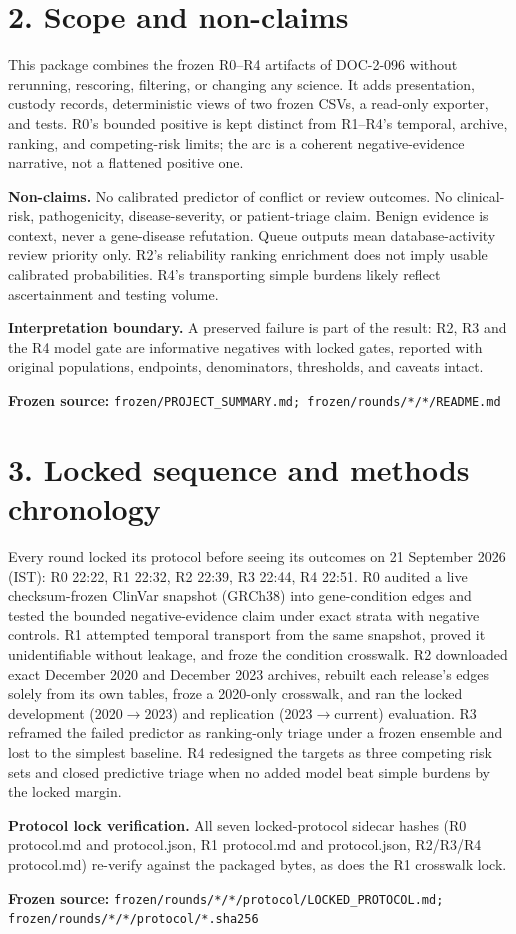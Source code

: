 \documentclass[10pt]{article}
\newcommand{\src}[1]{\par\vfill\noindent\parbox{\linewidth}{\raggedright\sloppy\scriptsize\color{BorderBlue}\textbf{Frozen source:} \texttt{#1}}}
\newcommand{\pg}[2]{\section*{#1}#2}
\begin{document}
\pg{2. Scope and non-claims}{This package combines the frozen R0--R4 artifacts of DOC-2-096 without rerunning, rescoring, filtering, or changing any science. It adds presentation, custody records, deterministic views of two frozen CSVs, a read-only exporter, and tests. R0's bounded positive is kept distinct from R1--R4's temporal, archive, ranking, and competing-risk limits; the arc is a coherent negative-evidence narrative, not a flattened positive one.\par\textbf{Non-claims.} No calibrated predictor of conflict or review outcomes. No clinical-risk, pathogenicity, disease-severity, or patient-triage claim. Benign evidence is context, never a gene-disease refutation. Queue outputs mean database-activity review priority only. R2's reliability ranking enrichment does not imply usable calibrated probabilities. R4's transporting simple burdens likely reflect ascertainment and testing volume.\par\textbf{Interpretation boundary.} A preserved failure is part of the result: R2, R3 and the R4 model gate are informative negatives with locked gates, reported with original populations, endpoints, denominators, thresholds, and caveats intact.}\src{frozen/PROJECT\_SUMMARY.md; frozen/rounds/*/*/README.md}\newpage

\pg{3. Locked sequence and methods chronology}{Every round locked its protocol before seeing its outcomes on 21 September 2026 (IST): R0 22:22, R1 22:32, R2 22:39, R3 22:44, R4 22:51. R0 audited a live checksum-frozen ClinVar snapshot (GRCh38) into gene-condition edges and tested the bounded negative-evidence claim under exact strata with negative controls. R1 attempted temporal transport from the same snapshot, proved it unidentifiable without leakage, and froze the condition crosswalk. R2 downloaded exact December 2020 and December 2023 archives, rebuilt each release's edges solely from its own tables, froze a 2020-only crosswalk, and ran the locked development (2020$\to$2023) and replication (2023$\to$current) evaluation. R3 reframed the failed predictor as ranking-only triage under a frozen ensemble and lost to the simplest baseline. R4 redesigned the targets as three competing risk sets and closed predictive triage when no added model beat simple burdens by the locked margin.\par\textbf{Protocol lock verification.} All seven locked-protocol sidecar hashes (R0 protocol.md and protocol.json, R1 protocol.md and protocol.json, R2/R3/R4 protocol.md) re-verify against the packaged bytes, as does the R1 crosswalk lock.}\src{frozen/rounds/*/*/protocol/LOCKED\_PROTOCOL.md; frozen/rounds/*/*/protocol/*.sha256}\newpage
\end{document}
